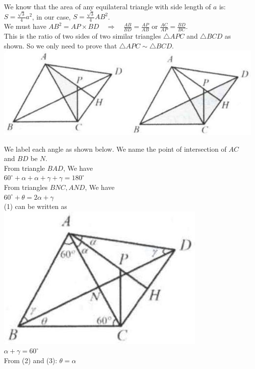 \documentclass{article}
\begin{document}
We know that the area of any equilateral triangle with side length of \(a\) is: \(S=\frac{\sqrt{3}}{4} a^{2}\), in our case, \(S=\frac{\sqrt{3}}{4} A B^{2}\).\\
We must have \(A B^{2}=A P \times B D \quad \Rightarrow \quad \frac{A B}{B D}=\frac{A P}{A B}\) or \(\frac{A C}{A P}=\frac{B D}{B C}\).\\
This is the ratio of two sides of two similar triangles \(\triangle A P C\) and \(\triangle B C D\) as shown. So we only need to prove that \(\triangle A P C \sim \triangle B C D\).\\
\centering
\includegraphics[width=\textwidth]{images/201.jpg}

We label each angle as shown below. We name the point of intersection of \(A C\) and \(B D\) be \(N\).\\
From triangle \(B A D\), We have\\
\(60^{\circ}+\alpha+\alpha+\gamma+\gamma=180^{\circ}\)\\
From triangles \(B N C, A N D\), We have\\
\(60^{\circ}+\theta=2 \alpha+\gamma\)\\
(1) can be written as\\
\centering
\includegraphics[width=\textwidth]{images/201(1).jpg}\\
\(\alpha+\gamma=60^{\circ}\)\\
From (2) and (3): \(\theta=\alpha\)
\end{document}
